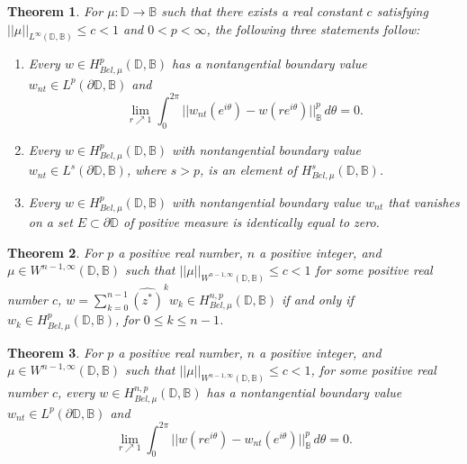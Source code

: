 \documentclass[10pt,a4paper]{amsart}
\newtheorem{theorem}{Theorem}
\newcommand{\bc}{\mathbb{B}}
\newcommand{\disk}{\mathbb{D}}
\newcommand{\p}{\partial}
\begin{document}
    \begin{theorem}\label{thm: bcbelbv}\label{thm: bcbetterbvbetterleb}\label{thm: bczeroonbcimpliesequivzero}
        For $\mu : \disk \to \bc$ such that there exists a real constant $c$ satisfying $||\mu||_{L^\infty(\disk,\bc)} \leq c < 1$ and $0 < p < \infty$, the following three statements follow:
	\begin{enumerate}
		\item Every $w \in H^p_{Bel,\mu}(\disk,\bc)$ has a nontangential boundary value $w_{nt} \in L^p(\p \disk, \bc)$ and
        \[
        \lim_{r \nearrow 1} \int_0^{2\pi} ||w_{nt}(e^{i\theta}) - w(re^{i\theta}) ||^p_{\bc} \, d\theta  = 0. 
    \]  
	\item Every $w \in H^p_{Bel,\mu}(\disk,\bc)$ with nontangential boundary value $w_{nt} \in L^s(\p\disk,\bc)$, where $s>p$, is an element of $H^s_{Bel,\mu}(\disk,\bc)$. 
	\item Every $w \in H^p_{Bel,\mu}(\disk,\bc)$ with nontangential boundary value $w_{nt}$ that vanishes on a set $E \subset \p \disk$ of positive measure is identically equal to zero. 
	\end{enumerate}
    \end{theorem}

\begin{theorem}\label{thm: bchoibinclusion}
For $p$ a positive real number, $n$ a positive integer, and $\mu \in W^{n-1,\infty}(\disk,\bc)$ such that $||\mu||_{W^{n-1,\infty}(\disk,\bc)}\leq c < 1$ for some positive real number $c$, $w = \sum_{k=0}^{n-1} \widehat{ (z^*)}^k w_k \in H^{n,p}_{Bel,\mu}(\disk,\bc)$ if and only if $w_k \in H^p_{Bel,\mu}(\disk,\bc)$, for $0 \leq k \leq n-1$. 
\end{theorem}

\begin{theorem}\label{thm: bcbelbvcon}
For $p$ a positive real number, $n$ a positive integer, and $\mu \in W^{n-1,\infty}(\disk,\bc)$ such that $||\mu||_{W^{n-1,\infty}(\disk,\bc)}\leq c < 1$, for some positive real number $c$, every $w \in H^{n,p}_{Bel,\mu}(\disk,\bc)$ has a nontangential boundary value $w_{nt} \in L^p(\p \disk,\bc)$ and 
\[
    \lim_{r\nearrow 1} \int_0^{2\pi} ||w(re^{i\theta})- w_{nt}(e^{i\theta})||_{\bc}^p\,d\theta = 0.
\]

\end{theorem}
\end{document}
